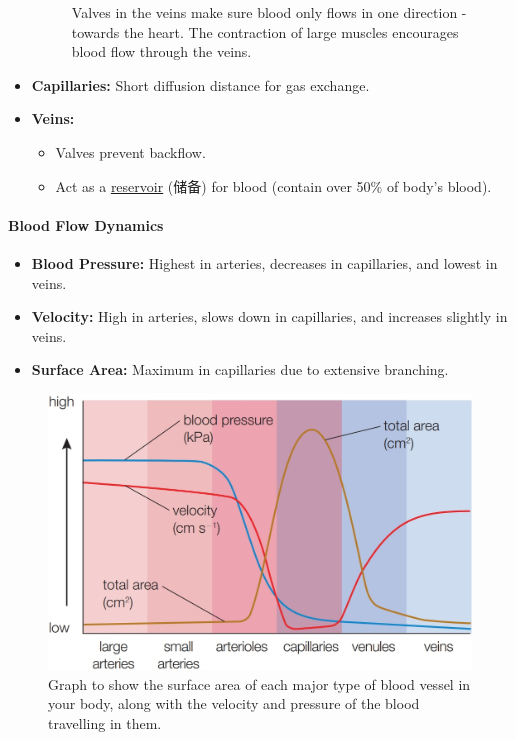 \begin{itemize}
\begin{figure}[H]
        \caption{Valves in the veins make sure blood only flows in one direction - towards the heart. The contraction of large
        muscles encourages blood flow through the veins.}
    \end{figure}
    \item \textbf{Capillaries:} Short diffusion distance for gas exchange.
    \item \textbf{Veins:}
    \begin{itemize}
        \item Valves prevent backflow.
        \item Act as a \underline{reservoir} (储备) for blood (contain over 50\% of body's blood).
    \end{itemize}
\end{itemize}

\paragraph{Blood Flow Dynamics}
\begin{itemize}
    \item \textbf{Blood Pressure:} Highest in arteries, decreases in capillaries, and lowest in veins.
    \item \textbf{Velocity:} High in arteries, slows down in capillaries, and increases slightly in veins.
    \item \textbf{Surface Area:} Maximum in capillaries due to extensive branching.
\end{itemize}
\begin{figure}[H]
    \centering
    \includegraphics[scale=0.25]{Biology/1B/Images/1B-3-6.png}
    \caption{Graph to show the surface area of each major type of blood vessel in your body, along with the velocity and pressure
    of the blood travelling in them.}
\end{figure}